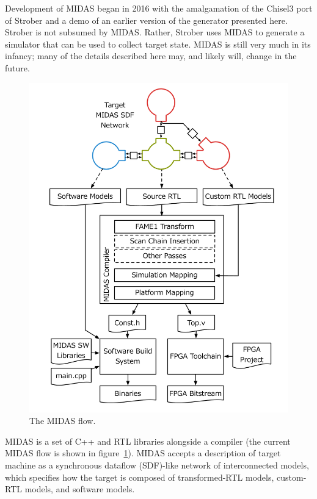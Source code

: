 Development of MIDAS began in 2016 with the amalgamation of the Chisel3 port of
Strober and a demo of an earlier version of the generator presented here.
Strober is not subsumed by MIDAS.  Rather, Strober uses MIDAS to generate a
simulator that can be used to collect target state. MIDAS is still very much in
its infancy; many of the details described here may, and likely will, change in
the future.

\begin{figure}
	\centering
	\includegraphics[width=16cm]{figures/toolchain.pdf}
    \caption{The MIDAS flow.}
	\label{fig:midas}
\end{figure}

MIDAS is a set of C++ and RTL libraries alongside a compiler (the current MIDAS
flow is shown in figure~\ref{fig:midas}). MIDAS accepts a description of target
machine as a synchronous dataflow (SDF)-like network of interconnected models,
which specifies how the target is composed of transformed-RTL models,
custom-RTL models, and software models.

